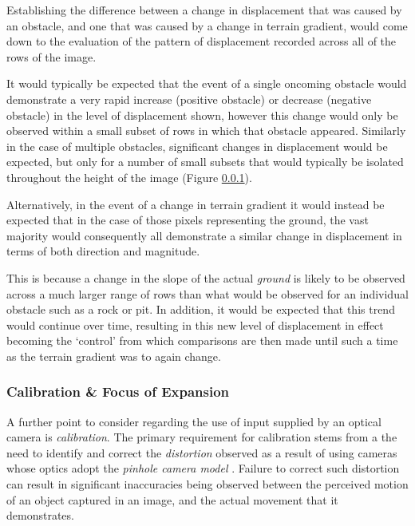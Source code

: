  Establishing the difference between a change in displacement that was caused by an obstacle, and one that was caused by a change in terrain gradient, would come down to the evaluation of the pattern of displacement recorded across all of the rows of the image.
 
 It would typically be expected that the event of a single oncoming obstacle would demonstrate a very rapid increase (positive obstacle) or decrease (negative obstacle) in the level of displacement shown, however this change would only be observed within a small subset of rows in which that obstacle appeared. Similarly in the case of multiple obstacles, significant changes in displacement would be expected, but only for a number of small subsets that would typically be isolated throughout the height of the image (Figure \ref{}).
 
 
 Alternatively, in the event of a change in terrain gradient it would instead be expected that in the case of those pixels representing the ground, the vast majority would consequently all demonstrate a similar change in displacement in terms of both direction and magnitude.

 This is because a change in the slope of the actual \textit{ground} is likely to be observed across a much larger range of rows than what would be observed for an individual obstacle such as a rock or pit.  In addition, it would be expected that this trend would continue over time, resulting in this new level of displacement in effect becoming the `control' from which comparisons are then made until such a time as the terrain gradient was to again change. 
 
 
\subsubsection{Calibration \& Focus of Expansion}

A further point to consider regarding the use of input supplied by an optical camera is \textit{calibration}. The primary requirement for calibration stems from a
the need to identify and correct the \textit{distortion} observed as a result of using cameras whose optics adopt the \textit{pinhole camera model} \cite{camera-calib}. Failure to correct such distortion can result in significant inaccuracies being observed between the perceived motion of an object captured in an image, and the actual movement that it demonstrates. 

